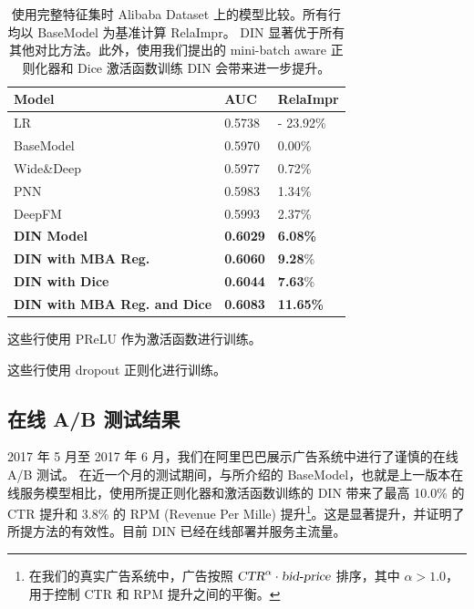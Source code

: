 \begin{table}[!t]
\caption{使用完整特征集时 Alibaba Dataset 上的模型比较。所有行均以 BaseModel 为基准计算 RelaImpr。
DIN 显著优于所有其他对比方法。此外，使用我们提出的 mini-batch aware 正则化器和 Dice 激活函数训练 DIN 会带来进一步提升。}
\small
\centering
\begin{threeparttable}
\begin{tabular}{p{4cm} p{1.5cm}<{\centering} p{1.5cm}<{\centering}}
\toprule
Model & AUC & RelaImpr \\ \midrule
LR                                  & 0.5738 &  - 23.92\%  \\    
BaseModel\tnote{a,b}               & 0.5970 &  0.00\% \\
Wide\&Deep\tnote{a,b}               & 0.5977 &  0.72\%  \\
PNN\tnote{a,b}                      & 0.5983 &  1.34\%  \\
DeepFM\tnote{a,b}                   & 0.5993 &  2.37\%  \\
\textbf{DIN Model\tnote{a,b}}       & \textbf{0.6029} & \textbf{6.08\%} \\
\textbf{DIN with MBA Reg.\tnote{a}} & \textbf{0.6060} &  \textbf{9.28}\%  \\
\textbf{DIN with Dice \tnote{b}}    & \textbf{0.6044} &  \textbf{7.63}\%  \\
\textbf{DIN with MBA Reg. and Dice} & \textbf{0.6083} &  \textbf{11.65\%}  \\ \bottomrule
\end{tabular}
\begin{tablenotes}%
        \item[a] 这些行使用 PReLU 作为激活函数进行训练。
        \item[b] 这些行使用 dropout 正则化进行训练。
      \end{tablenotes}
      \end{threeparttable}
\label{table:ali}
\end{table}


\subsection{在线 A/B 测试结果}
2017 年 5 月至 2017 年 6 月，我们在阿里巴巴展示广告系统中进行了谨慎的在线 A/B 测试。
在近一个月的测试期间，与所介绍的 BaseModel，也就是上一版本在线服务模型相比，使用所提正则化器和激活函数训练的 DIN 带来了最高 10.0\% 的 CTR 提升和 3.8\% 的 RPM (Revenue Per Mille) 提升\footnote{在我们的真实广告系统中，广告按照 $\textsl{CTR}^\alpha \cdot \textsl{bid-price}$ 排序，其中 $\alpha > 1.0$，用于控制 CTR 和 RPM 提升之间的平衡。}。这是显著提升，并证明了所提方法的有效性。目前 DIN 已经在线部署并服务主流量。

